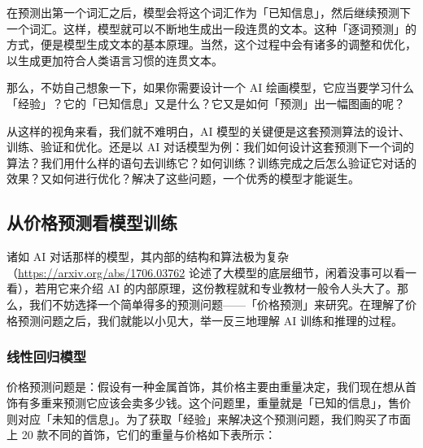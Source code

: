 在预测出第一个词汇之后，模型会将这个词汇作为「已知信息」，然后继续预测下一个词汇。这样，模型就可以不断地生成出一段连贯的文本。这种「逐词预测」的方式，便是模型生成文本的基本原理。当然，这个过程中会有诸多的调整和优化，以生成更加符合人类语言习惯的连贯文本。

\begin{note}
  那么，不妨自己想象一下，如果你需要设计一个 AI 绘画模型，它应当要学习什么「经验」？它的「已知信息」又是什么？它又是如何「预测」出一幅图画的呢？
\end{note}

从这样的视角来看，我们就不难明白，AI 模型的关键便是这套预测算法的设计、训练、验证和优化。还是以 AI 对话模型为例：我们如何设计这套预测下一个词的算法？我们用什么样的语句去训练它？如何训练？训练完成之后怎么验证它对话的效果？又如何进行优化？解决了这些问题，一个优秀的模型才能诞生。

\subsection{从价格预测看模型训练}

诸如 AI 对话那样的模型，其内部的结构和算法极为复杂（\url{https://arxiv.org/abs/1706.03762} 论述了大模型的底层细节，闲着没事可以看一看），若用它来介绍 AI 的内部原理，这份教程就和专业教材一般令人头大了。那么，我们不妨选择一个简单得多的预测问题——「价格预测」来研究。在理解了价格预测问题之后，我们就能以小见大，举一反三地理解 AI 训练和推理的过程。

\subsubsection{线性回归模型}

价格预测问题是：假设有一种金属首饰，其价格主要由重量决定，我们现在想从首饰有多重来预测它应该会卖多少钱。这个问题里，重量就是「已知的信息」，售价则对应「未知的信息」。为了获取「经验」来解决这个预测问题，我们购买了市面上 20 款不同的首饰，它们的重量与价格如下表所示：

